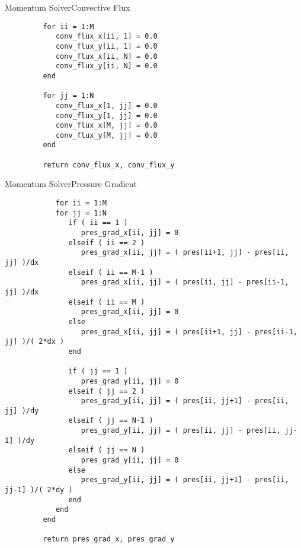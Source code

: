 \documentclass[\string~/GitHub/sthlmNordBeamerTheme/sthlmNordLightDemo.tex]{subfiles}
\begin{document}
\begin{frame}{Momentum Solver}{Convective Flux}
\begin{center}
\begin{verbatim}
         for ii = 1:M
            conv_flux_x[ii, 1] = 0.0
            conv_flux_y[ii, 1] = 0.0
            conv_flux_x[ii, N] = 0.0
            conv_flux_y[ii, N] = 0.0
         end

         for jj = 1:N
            conv_flux_x[1, jj] = 0.0
            conv_flux_y[1, jj] = 0.0
            conv_flux_x[M, jj] = 0.0
            conv_flux_y[M, jj] = 0.0
         end

         return conv_flux_x, conv_flux_y
        \end{verbatim}
    \end{center}
    
\end{frame}

\begin{frame}{Momentum Solver}{Pressure Gradient}

    \begin{center}
        \begin{verbatim}
            for ii = 1:M
            for jj = 1:N
               if ( ii == 1 )
                  pres_grad_x[ii, jj] = 0
               elseif ( ii == 2 )
                  pres_grad_x[ii, jj] = ( pres[ii+1, jj] - pres[ii, jj] )/dx
               elseif ( ii == M-1 )
                  pres_grad_x[ii, jj] = ( pres[ii, jj] - pres[ii-1, jj] )/dx
               elseif ( ii == M )
                  pres_grad_x[ii, jj] = 0
               else
                  pres_grad_x[ii, jj] = ( pres[ii+1, jj] - pres[ii-1, jj] )/( 2*dx )
               end

               if ( jj == 1 )
                  pres_grad_y[ii, jj] = 0
               elseif ( jj == 2 )
                  pres_grad_y[ii, jj] = ( pres[ii, jj+1] - pres[ii, jj] )/dy
               elseif ( jj == N-1 )
                  pres_grad_y[ii, jj] = ( pres[ii, jj] - pres[ii, jj-1] )/dy
               elseif ( jj == N )
                  pres_grad_y[ii, jj] = 0
               else
                  pres_grad_y[ii, jj] = ( pres[ii, jj+1] - pres[ii, jj-1] )/( 2*dy )
               end
            end
         end

         return pres_grad_x, pres_grad_y
        \end{verbatim}
    \end{center}
    
\end{frame}
\end{document}
